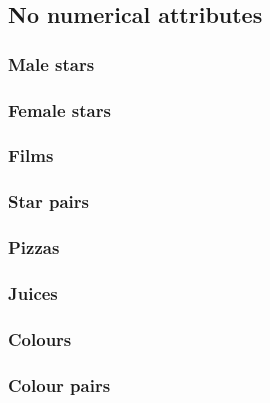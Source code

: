 \documentclass[11pt,letter]{article}
\begin{document}
\subsection{No numerical attributes}

\subsubsection{Male stars}



\subsubsection{Female stars}



\subsubsection{Films}



\subsubsection{Star pairs}



\subsubsection{Pizzas}



\subsubsection{Juices}



\subsubsection{Colours}



\subsubsection{Colour pairs}


\end{document}
